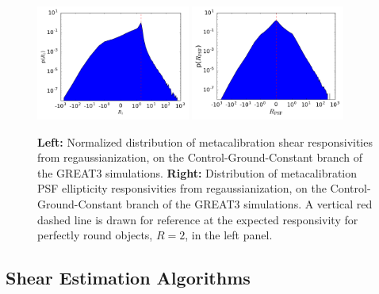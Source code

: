 \documentclass[iop]{emulateapj}
\newcommand\rmcomment[1]{\textcolor{red}{(RM: #1)}}
\begin{document}

\begin{figure}
\begin{center}
\includegraphics[width=0.45\textwidth]{R1_hist.pdf}
\includegraphics[width=0.45\textwidth]{a1_hist.pdf}
\end{center}
\caption{{\bf Left:} Normalized distribution of metacalibration shear
  responsivities from regaussianization, on the
  Control-Ground-Constant branch of the GREAT3 simulations.  {\bf
    Right:} Distribution of metacalibration PSF ellipticity
  responsivities from regaussianization, on the
  Control-Ground-Constant branch of the GREAT3 simulations. A
  vertical red dashed line is drawn for reference at the expected
  responsivity for perfectly round objects, $R=2$, in the left
  panel. }
\label{fig:calibhist}
\end{figure}


\subsection{Shear Estimation Algorithms}
\end{document}
